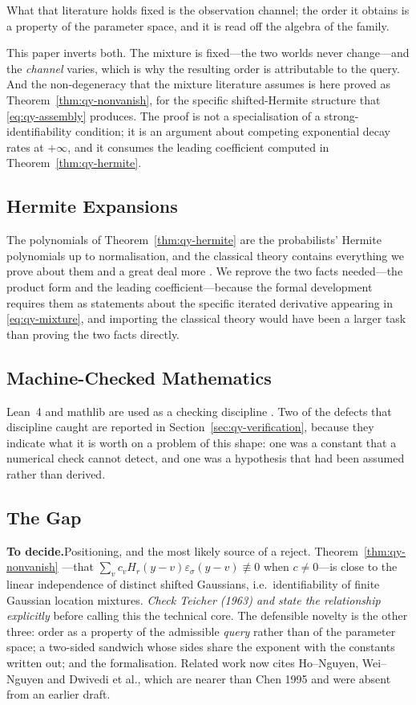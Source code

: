 \documentclass[conference]{IEEEtran}
\theoremstyle{definition}
\newif\ifshownotes\shownotestrue
\newcommand{\TODOPAR}[1]{\ifshownotes\par\vspace{2pt}\noindent%
  {\color{todocol}\textsf{\footnotesize\textbf{To decide.}\;#1}}\par\vspace{2pt}\fi}
\begin{document}
What that literature holds fixed is the observation channel; the order it obtains is a
property of the parameter space, and it is read off the algebra of the family.

This paper inverts both. The mixture is fixed---the two worlds never change---and the
\emph{channel} varies, which is why the resulting order is attributable to the query. And
the non-degeneracy that the mixture literature assumes is here proved as
Theorem~\ref{thm:qy-nonvanish}, for the specific shifted-Hermite structure that
\eqref{eq:qy-assembly} produces. The proof is not a specialisation of a strong-identifiability
condition; it is an argument about competing exponential decay rates at $+\infty$, and it
consumes the leading coefficient computed in Theorem~\ref{thm:qy-hermite}.

\subsection{Hermite Expansions}

The polynomials of Theorem~\ref{thm:qy-hermite} are the probabilists' Hermite polynomials up to
normalisation, and the classical theory contains everything we prove about them and a great
deal more \cite{szego1939}. We reprove the two facts needed---the product form and the
leading coefficient---because the formal development requires them as statements about the
specific iterated derivative appearing in \eqref{eq:qy-mixture}, and importing the classical
theory would have been a larger task than proving the two facts directly.

\subsection{Machine-Checked Mathematics}

Lean~4 and mathlib are used as a checking discipline \cite{demoura2021,mathlib2020}. Two of
the defects that discipline caught are reported in Section~\ref{sec:qy-verification}, because
they indicate what it is worth on a problem of this shape: one was a constant that a
numerical check cannot detect, and one was a hypothesis that had been assumed rather than
derived.

\subsection{The Gap}
\TODOPAR{Positioning, and the most likely source of a reject. Theorem~\ref{thm:qy-nonvanish}
---that $\sum_{v}c_{v}H_{r}(y-v)\varepsilon_{\sigma}(y-v)\not\equiv0$ when $c\neq0$---is close
to the linear independence of distinct shifted Gaussians, i.e.\ identifiability of finite
Gaussian location mixtures. \emph{Check Teicher (1963) and state the relationship explicitly}
before calling this the technical core. The defensible novelty is the other three: order as a
property of the admissible \emph{query} rather than of the parameter space; a two-sided
sandwich whose sides share the exponent with the constants written out; and the
formalisation. Related work now cites Ho--Nguyen, Wei--Nguyen and Dwivedi et al., which are
nearer than Chen 1995 and were absent from an earlier draft.}
\end{document}
